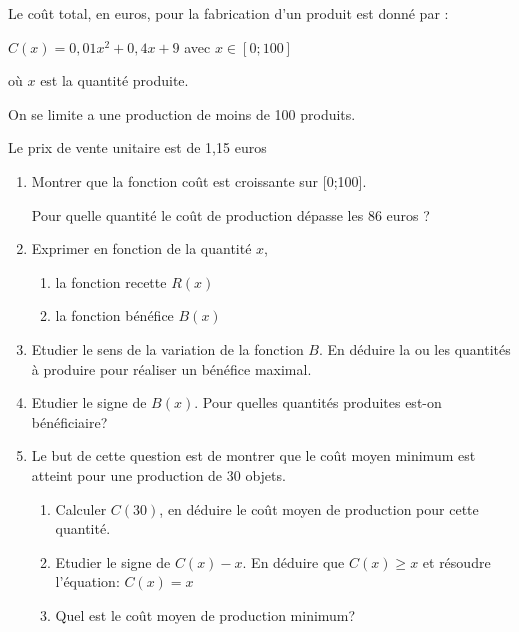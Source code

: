 
%
Le coût total, en euros, pour la fabrication d'un produit est donné par :
\par
$C\left(x\right)=0,01x^{2}+0,4x+9$ avec $x \in \left[0;100\right]$
\par
où $x$ est la quantité produite.
\par
On se limite a une production de moins de 100 produits.
\par
Le prix de vente unitaire est de 1,15 euros
\begin{enumerate}
     \item
     Montrer que la fonction coût est croissante sur [0;100].
     \par
     Pour quelle quantité le coût de production dépasse les 86 euros ?
     \item
     Exprimer en fonction de la quantité $x$,
     \begin{enumerate}[label=\alph*.]
          \item
          la fonction recette $R\left(x\right)$
          \item
          la fonction bénéfice $B\left(x\right)$
     \end{enumerate}
     \item
     Etudier le sens de la variation de la fonction $B$. En déduire la ou les quantités à produire pour réaliser un bénéfice maximal.
     \item
     Etudier le signe de $B\left(x\right)$. Pour quelles quantités produites est-on bénéficiaire?
     \item
     Le but de cette question est de montrer que le coût moyen minimum est atteint pour une production de 30 objets.
     \begin{enumerate}[label=\alph*.]
          \item
          Calculer $C\left(30\right)$, en déduire le coût moyen de production pour cette quantité.
          \item
          Etudier le signe de $C\left(x\right) -x$. En déduire que $C\left(x\right) \geqslant x$ et résoudre l'équation: $C\left(x\right)=x$
          \item
          Quel est le coût moyen de production minimum?
     \end{enumerate}
\end{enumerate}
